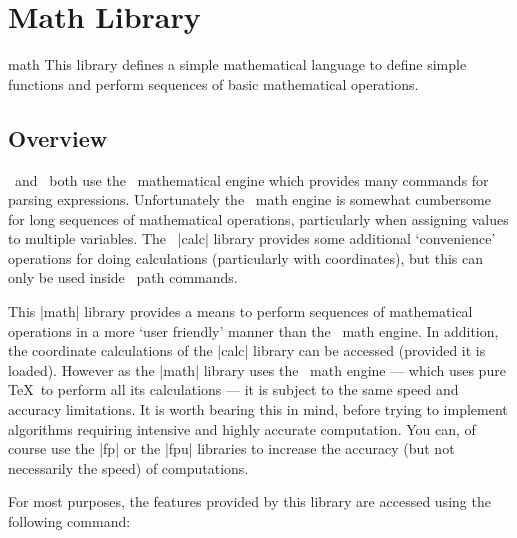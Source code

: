 %
%
%



\section{Math Library}
\label{section-library-math}

\begin{tikzlibrary}{math}
  This library defines a simple mathematical language
  to define simple functions and perform sequences of basic mathematical 
  operations.
\end{tikzlibrary}


\subsection{Overview}

	\pgfname\ and \tikzname\ both use the \pgfname\ mathematical engine
	which provides many commands for parsing expressions. Unfortunately
	the \pgfname\ math engine is somewhat cumbersome for long sequences 
	of mathematical 
	operations, particularly when assigning values to multiple variables.
	The \tikzname\ |calc| library
	provides some additional `convenience' operations for doing calculations
	(particularly with coordinates), but this can only be used inside
	\tikzname\ path commands.
	
	This |math| library provides a means to
	perform sequences of mathematical operations in a more `user friendly'
	manner than the \pgfname\ math engine. In addition, the coordinate calculations of the |calc| library 
	can be accessed (provided it is loaded).
	However as the |math| library uses the \pgfname\ math engine --- which uses pure \TeX\ 
	to perform all its calculations --- it is subject to the same speed
	and accuracy limitations. It is worth bearing this in mind, before 
	trying to implement algorithms requiring intensive and highly
	accurate computation. You can, of course use the |fp| or the |fpu|
	libraries to increase the accuracy (but not necessarily the speed)
	of computations.
	
	For most purposes, the features provided by this library are accessed
	using the following command:
	
